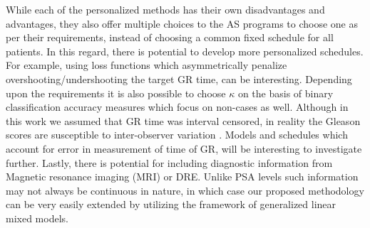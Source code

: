 While each of the personalized methods has their own disadvantages and advantages, they also offer multiple choices to the AS programs to choose one as per their requirements, instead of choosing a common fixed schedule for all patients. In this regard, there is potential to develop more personalized schedules. For example, using loss functions which asymmetrically penalize overshooting/undershooting the target GR time, can be interesting. Depending upon the requirements it is also possible to choose $\kappa$ on the basis of binary classification accuracy measures which focus on non-cases as well. Although in this work we assumed that GR time was interval censored, in reality the Gleason scores are susceptible to inter-observer variation \citep{Gleason_interobs_var}. Models and schedules which account for error in measurement of time of GR, will be interesting to investigate further. Lastly, there is potential for including diagnostic information from Magnetic resonance imaging (MRI) or DRE. Unlike PSA levels such information may not always be continuous in nature, in which case our proposed methodology can be very easily extended by utilizing the framework of generalized linear mixed models.